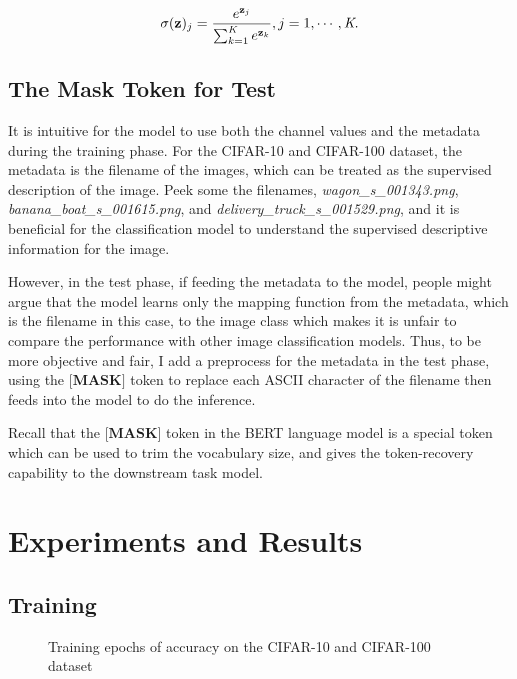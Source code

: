 \documentclass[review]{cvpr}
\begin{document}
\begin{equation}
  \sigma(\textbf{z})_j = {e^{\textbf{z}_j} \over {\sum_{k=1}^{\textit{K}} e^{\textbf{z}_k}}}, j=1,\cdots,\textit{K}.
\end{equation}

\subsection{The Mask Token for Test}

\par It is intuitive for the model to use both the channel values and the metadata during the training phase.
For the CIFAR-10 and CIFAR-100 dataset, the metadata is the filename of the images, which can be treated as the supervised description of the image.
Peek some the filenames, \eg \textit{wagon\_s\_001343.png}, \textit{banana\_boat\_s\_001615.png}, and \textit{delivery\_truck\_s\_001529.png},
and it is beneficial for the classification model to understand the supervised descriptive information for the image.

\par However, in the test phase, if feeding the metadata to the model, people might argue that the model learns only the mapping function from
the metadata, which is the filename in this case, to the image class
which makes it is unfair to compare the performance with other image classification models.
Thus, to be more objective and fair, I add a preprocess for the metadata in the test phase, using the $\textbf{[MASK]}$ token to replace each
ASCII character of the filename then feeds into the model to do the inference.

\par Recall that the $\textbf{[MASK]}$ token in the BERT language model is a special token which can be used to trim the vocabulary size,
and gives the token-recovery capability to the downstream task model.



\section{Experiments and Results}


\subsection{Training}

\begin{figure*}
\begin{center}
\end{center}
   \caption{Training epochs of accuracy on the CIFAR-10 and CIFAR-100 dataset}
\label{fig:short}
\end{figure*}
\end{document}
